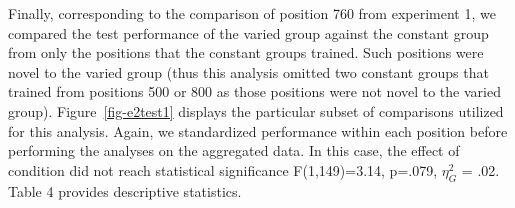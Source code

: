 \documentclass[
  12pt,
  letterpaper,
]{article}
\begin{document}
\begin{table}

\caption{\label{tbl-e2table2}Testing performance from novel positions.
Includes data only from positions that were not encountered during the
training stage (e.g.~excludes positions 500 and 800 for the varied
group, and one of the six locations for each of the constant groups).
Table presents Mean absolute deviations from the center of the target,
and standard deviations in parenthesis.}


\end{table}%

Finally, corresponding to the comparison of position 760 from experiment
1, we compared the test performance of the varied group against the
constant group from only the positions that the constant groups trained.
Such positions were novel to the varied group (thus this analysis
omitted two constant groups that trained from positions 500 or 800 as
those positions were not novel to the varied group).
Figure~\ref{fig-e2test1} displays the particular subset of comparisons
utilized for this analysis. Again, we standardized performance within
each position before performing the analyses on the aggregated data. In
this case, the effect of condition did not reach statistical
significance F(1,149)=3.14, p=.079, \(\eta^{2}_G\) = .02. Table 4
provides descriptive statistics.
\end{document}

